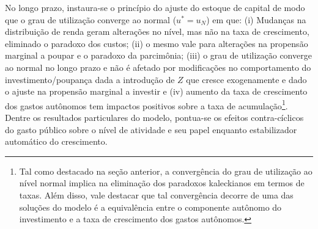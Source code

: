 No longo prazo, instaura-se o princípio do ajuste do estoque de capital de modo que o grau de utilização converge ao normal ($u^* = u_N$) em que: (i) Mudanças na distribuição de renda geram alterações no nível, mas não na taxa de crescimento, eliminado o paradoxo dos custos; (ii) o mesmo vale para alterações na propensão marginal a poupar e o paradoxo da parcimônia; (iii) o grau de utilização converge ao normal no longo prazo e não é afetado por modificações no comportamento do investimento/poupança dada a introdução de $Z$ que cresce exogenamente e dado o ajuste na propensão marginal a investir e (iv) aumento da taxa de crescimento dos gastos autônomos tem impactos positivos sobre a taxa de acumulação\footnote{
	Tal como destacado na seção anterior, a convergência do grau de utilização ao nível normal implica na eliminação dos paradoxos kaleckianos em termos de taxas. Além disso, vale destacar que tal convergência decorre de uma das soluções do modelo é a equivalência entre o componente autônomo do investimento e a taxa de crescimento dos gastos autônomos.
}.  Dentre os resultados particulares do modelo, \textcite{allain_macroeconomic_2014} pontua-se os efeitos contra-cíclicos do gasto público sobre o nível de atividade e seu papel enquanto estabilizador automático do crescimento.




